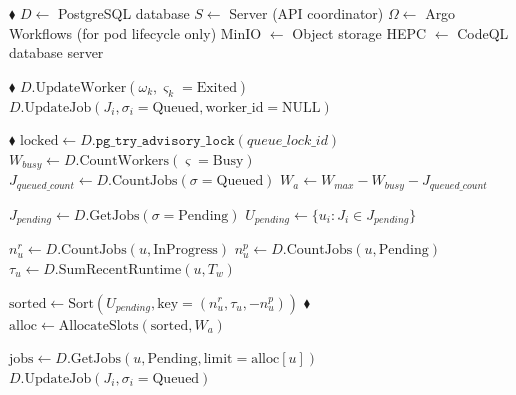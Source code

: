 \documentclass[11pt]{article}
\newcommand{\reporoot}{/Users/mhohn5/c/example/psa-mrva/mrvacommander}
\newcommand{\gomark}[2]{\href{vscode://file\reporoot/#1:#2}{\textcolor{gray!90}{$\blacklozenge$}}}
\begin{document}
\begin{algorithmic}[1]

      \State {}
      \gomark{pkg/pool/pool.go}{26}
      \State $D \gets$ PostgreSQL database
      \State $S \gets$ Server (API coordinator)
      \State $\Omega \gets$ Argo Workflows (for pod lifecycle only)
      \State MinIO $\gets$ Object storage
      \State HEPC $\gets$ CodeQL database server


        \State {}
        \gomark{pkg/pool/pool.go}{342}
          \State $D.\text{UpdateWorker}(\omega_k, \varsigma_k = \text{Exited})$
            \State $D.\text{UpdateJob}(J_i, \sigma_i = \text{Queued}, \text{worker\_id} = \text{NULL})$
          \EndIf
        \EndFor

        \State {}
        \gomark{pkg/pool/pool.go}{210}
        \State $\text{locked} \gets D.\texttt{pg\_try\_advisory\_lock}(\textit{queue\_lock\_id})$
          \State $W_{busy} \gets D.\text{CountWorkers}(\varsigma = \text{Busy})$
          \State $J_{queued\_count} \gets D.\text{CountJobs}(\sigma = \text{Queued})$
          \State $W_a \gets W_{max} - W_{busy} - J_{queued\_count}$

            \State $J_{pending} \gets D.\text{GetJobs}(\sigma = \text{Pending})$
            \State $U_{pending} \gets \{u_i : J_i \in J_{pending}\}$

              \State $n_u^r \gets D.\text{CountJobs}(u, \text{InProgress})$
              \State $n_u^p \gets D.\text{CountJobs}(u, \text{Pending})$
              \State $\tau_u \gets D.\text{SumRecentRuntime}(u, T_w)$
            \EndFor

            \State $\text{sorted} \gets \text{Sort}(U_{pending}, \text{key} = (n_u^r, \tau_u, -n_u^p))$
            \gomark{pkg/pool/pool.go}{541}
            \State $\text{alloc} \gets \text{AllocateSlots}(\text{sorted}, W_a)$

              \State $\text{jobs} \gets D.\text{GetJobs}(u, \text{Pending}, \text{limit} = \text{alloc}[u])$
                \State $D.\text{UpdateJob}(J_i, \sigma_i = \text{Queued})$
              \EndFor
            \EndFor


\end{algorithmic}
\end{document}
